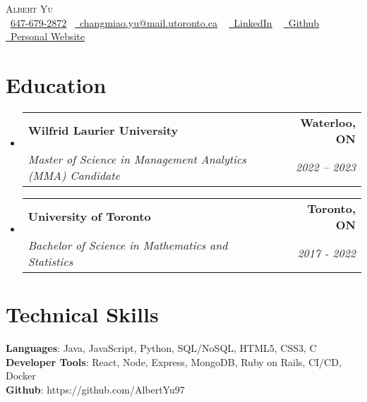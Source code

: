 \documentclass[letterpaper,11pt]{article}
\makeatletter
\newcommand{\resumeSubheading}[4]{
  \vspace{-2pt}\item
    \begin{tabular*}{1.0\textwidth}[t]{l@{\extracolsep{\fill}}r}
      \textbf{#1} & \textbf{\small #2} \\
      \textit{\small#3} & \textit{\small #4} \\
    \end{tabular*}\vspace{-7pt}
}
\newcommand{\resumeSubHeadingListStart}{\begin{itemize}[leftmargin=0.0in, label={}]}
\newcommand{\resumeSubHeadingListEnd}{\end{itemize}}
\makeatother
\begin{document}
\begin{center}
    {\Huge \scshape Albert Yu} \\ \vspace{1pt}
    \small \raisebox{-0.1\height}\faPhone\ \underline{647-679-2872}~ \href{changmiao.yu@mail.utoronto.ca}{\raisebox{-0.2\height}\faEnvelope\  \underline{changmiao.yu@mail.utoronto.ca}} ~ 
    \href{https://www.linkedin.com/in/albert-changmiao-yu/}{\raisebox{-0.2\height}\faLinkedin\ \underline{LinkedIn}}  ~
    \href{https://github.com/AlbertYu97}{\raisebox{-0.2\height}\faGithub\ \underline{Github}}
    \href{https://albertyu97.github.io/Albert_Website_Design/}{\ \underline{Personal Website}}
    \vspace{-8pt}
\end{center}


\section{Education}
  \resumeSubHeadingListStart
    \resumeSubheading
      {Wilfrid Laurier University}{Waterloo, ON}
      {Master of Science in Management Analytics (MMA) Candidate}{2022 – 2023}
    \resumeSubheading
      {University of Toronto}{Toronto, ON}
      {Bachelor of Science in Mathematics and Statistics}{2017 - 2022}

  \resumeSubHeadingListEnd

  

%
\section{Technical Skills}
  \begin{itemize}[leftmargin=0.15in, label={}]
    \small{\item{
      \textbf{Languages}{: Java, JavaScript, Python, SQL/NoSQL, HTML5, CSS3, C} \\
      \textbf{Developer Tools}{: React, Node, Express, MongoDB, Ruby on Rails, CI/CD, Docker} \\
      \textbf{Github}{: https://github.com/AlbertYu97} \\
    }}
  \end{itemize}
\vspace{-16pt}

\end{document}
